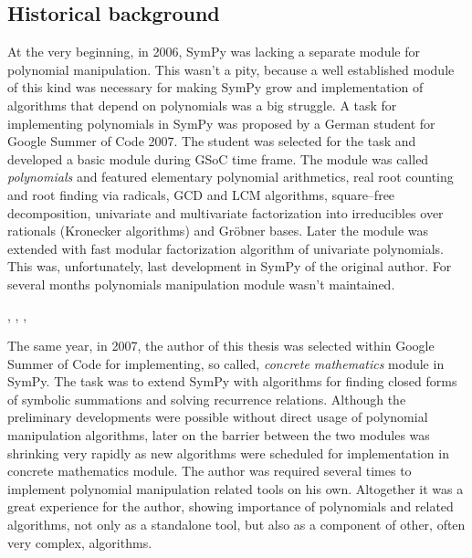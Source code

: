 \subsection{Historical background}

At the very beginning, in 2006, SymPy was lacking a separate module for polynomial manipulation.
This wasn't a pity, because a well established module of this kind was necessary for making SymPy
grow and implementation of algorithms that depend on polynomials was a big struggle. A task for
implementing polynomials in SymPy was proposed by a German student for Google Summer of Code 2007.
The student was selected for the task and developed a basic module during GSoC time frame. The module
was called \emph{polynomials} and featured elementary polynomial arithmetics, real root counting and root
finding via radicals, GCD and LCM algorithms, square--free decomposition, univariate and multivariate
factorization into irreducibles over rationals (Kronecker algorithms) and Gröbner bases. Later the
module was extended with fast modular factorization algorithm of univariate polynomials. This was,
unfortunately, last development in SymPy of the original author. For several months polynomials
manipulation module wasn't maintained.

\cite{Abramov1995rational},
\cite{Petkovsek1992hyper},
\cite{Nemes1997monthly},
\cite{Petkovsek1997AeqB}

The same year, in 2007, the author of this thesis was selected within Google Summer of Code for
implementing, so called, \emph{concrete mathematics} module in SymPy. The task was to extend SymPy
with algorithms for finding closed forms of symbolic summations and solving recurrence relations.
Although the preliminary developments were possible without direct usage of polynomial manipulation
algorithms, later on the barrier between the two modules was shrinking very rapidly as new algorithms
were scheduled for implementation in concrete mathematics module. The author was required several
times to implement polynomial manipulation related tools on his own. Altogether it was a great
experience for the author, showing importance of polynomials and related algorithms, not only as
a standalone tool, but also as a component of other, often very complex, algorithms.

